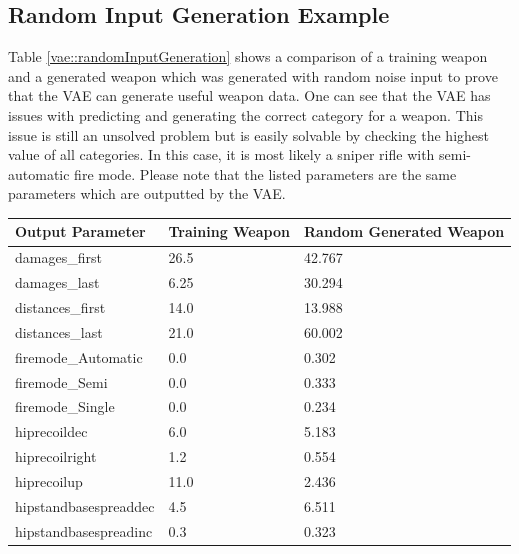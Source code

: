 \documentclass[MGS,Master,english]{twbook}%
\begin{document}
\subsection{Random Input Generation Example} \label{vae::randomInputExample}
Table \ref{vae::randomInputGeneration} shows a comparison of a training weapon and a generated weapon which was generated with random noise input to prove that the VAE can generate useful weapon data. One can see that the VAE has issues with predicting and generating the correct category for a weapon. This issue is still an unsolved problem but is easily solvable by checking the highest value of all categories. In this case, it is most likely a sniper rifle with semi-automatic fire mode. Please note that the listed parameters are the same parameters which are outputted by the VAE.
\begin{table}[!ht]
	\centering
	\begin{tabular}{|l|p{3.6cm}|p{3.6cm}|}
		\hline
		\textbf{Output Parameter}       & \textbf{Training Weapon} & \textbf{Random Generated Weapon} \\ \hline\hline
		damages\_first           & 26.5                 & 42.767                    \\ \hline
		damages\_last            & 6.25                 & 30.294                    \\ \hline
		distances\_first    & 14.0                 & 13.988                    \\ \hline
		distances\_last     & 21.0                 & 60.002                    \\ \hline
		firemode\_Automatic      & 0.0                  & 0.302                     \\ \hline
		firemode\_Semi & 0.0                  & 0.333                     \\ \hline
		firemode\_Single & 0.0                  & 0.234                     \\ \hline
		hiprecoildec             & 6.0                  & 5.183                     \\ \hline
		hiprecoilright           & 1.2                  & 0.554                     \\ \hline
		hiprecoilup              & 11.0                 & 2.436                     \\ \hline
		hipstandbasespreaddec    & 4.5                  & 6.511                     \\ \hline
		hipstandbasespreadinc    & 0.3                  & 0.323                     \\ \hline

\end{tabular}
\end{table}
\end{document}
